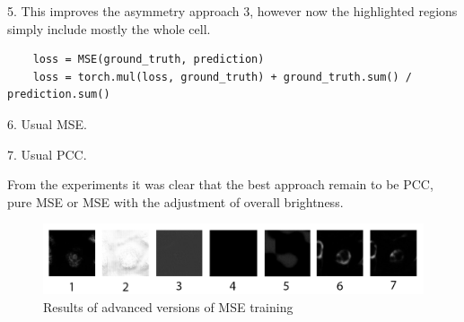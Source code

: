 5. This improves the asymmetry approach 3, however now the highlighted regions simply include mostly the whole cell.
\begin{lstlisting}
	loss = MSE(ground_truth, prediction)
	loss = torch.mul(loss, ground_truth) + ground_truth.sum() / prediction.sum()
\end{lstlisting}

6. Usual MSE.

7. Usual PCC.

From the experiments it was clear that the best approach remain to be PCC, pure MSE or MSE with the adjustment of overall brightness.

\begin{figure}[H]
	\begin{center}
		\includegraphics[width=\linewidth]{bilder/golgi/asymmetrical-predictions.png}
		\caption{Results of advanced versions of MSE training}\label{fig:golgi-asymmetrical-predictions}
	\end{center}
\end{figure}
